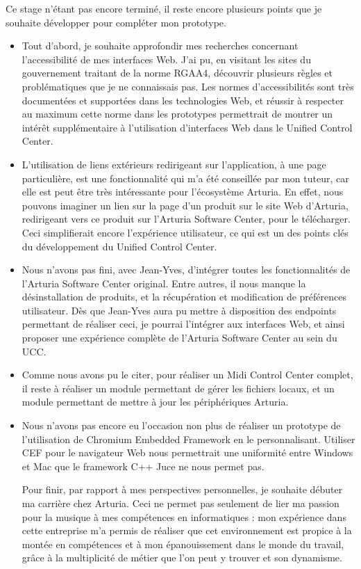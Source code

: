 \documentclass[francais]{rapportPFE}  %
\begin{document}
Ce stage n'étant pas encore terminé, il reste encore plusieurs points que je souhaite développer pour compléter mon prototype.
\begin{itemize}
    \item Tout d'abord, je souhaite approfondir mes recherches concernant l'accessibilité de mes interfaces Web. J'ai pu, en visitant les sites du gouvernement traitant de la norme RGAA4, découvrir plusieurs règles et problématiques que je ne connaissais pas. Les normes d'accessibilités sont très documentées et supportées dans les technologies Web, et réussir à respecter au maximum cette norme dans les prototypes permettrait de montrer un intérêt supplémentaire à l'utilisation d'interfaces Web dans le Unified Control Center.
    \item L'utilisation de liens extérieurs redirigeant sur l'application, à une page particulière, est une fonctionnalité qui m'a été conseillée par mon tuteur, car elle est peut être très intéressante pour l'écosystème Arturia. En effet, nous pouvons imaginer un lien sur la page d'un produit sur le site Web d'Arturia, redirigeant vers ce produit sur l'Arturia Software Center, pour le télécharger. Ceci simplifierait encore l'expérience utilisateur, ce qui est un des points clés du développement du Unified Control Center.
    \item Nous n'avons pas fini, avec Jean-Yves, d'intégrer toutes les fonctionnalités de l'Arturia Software Center original. Entre autres, il nous manque la désinstallation de produits, et la récupération et modification de préférences utilisateur. Dès que Jean-Yves aura pu mettre à disposition des endpoints permettant de réaliser ceci, je pourrai l'intégrer aux interfaces Web, et ainsi proposer une expérience complète de l'Arturia Software Center au sein du UCC.
    \item Comme nous avons pu le citer, pour réaliser un Midi Control Center complet, il reste à réaliser un module permettant de gérer les fichiers locaux, et un module permettant de mettre à jour les périphériques Arturia.
    \item Nous n'avons pas encore eu l'occasion non plus de réaliser un prototype de l'utilisation de Chromium Embedded Framework en le personnalisant. Utiliser CEF pour le navigateur Web nous permettrait une uniformité entre Windows et Mac que le framework C++ Juce ne nous permet pas.

Pour finir, par rapport à mes perspectives personnelles, je souhaite débuter ma carrière chez Arturia. Ceci ne permet pas seulement de lier ma passion pour la musique à mes compétences en informatiques : mon expérience dans cette entreprise m'a permis de réaliser que cet environnement est propice à la montée en compétences et à mon épanouissement dans le monde du travail, grâce à la multiplicité de métier que l'on peut y trouver et son dynamisme.
\end{itemize}
\end{document}
